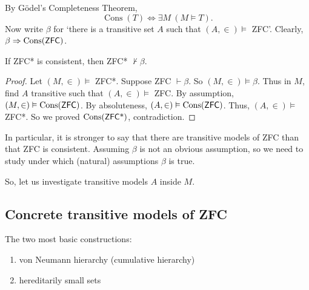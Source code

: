 \documentclass{article}
\DeclareMathOperator{\cons}{Cons}
\let\models\vDash
\begin{document}
By G\"odel's Completeness Theorem,
\begin{equation*}
  \cons(T) \iff \exists M\ (M \models T).
\end{equation*}
Now write $\beta$ for `there is a transitive set $A$ such that $(A,\in) \models$ \textsf{ZFC}'.
Clearly, $\beta \Rightarrow \cons(\text{\textsf{ZFC}})$.
\begin{thm}
  If \textsf{ZFC*} is consistent, then \textsf{ZFC*} $\nvdash \beta$.
\end{thm}
\begin{proof}
  Let $(M,\in) \models$ \textsf{ZFC}*. Suppose \textsf{ZFC} $\vdash \beta$. So $(M,\in) \vDash \beta$.
  Thus in $M$, find $A$ transitive such that $(A,\in) \models$ \textsf{ZFC}.
  By assumption, $(M,\in) \models \cons(\text{\textsf{ZFC}})$. By absoluteness, $(A,\in) \vDash \cons(\text{\textsf{ZFC}})$.
  Thus, $(A,\in) \vDash$ \textsf{ZFC}*.
  So we proved $\cons(\text{\textsf{ZFC}*})$, contradiction.
\end{proof}

In particular, it is stronger to say that there are transitive models of \textsf{ZFC} than that \textsf{ZFC} is consistent.
Assuming $\beta$ is not an obvious assumption, so we need to study under which (natural) assumptions $\beta$ is true.

So, let us investigate transitive models $A$ inside $M$.

\subsection{Concrete transitive models of \textsf{ZFC}}
The two most basic constructions:
\begin{enumerate}
  \item von Neumann hierarchy (cumulative hierarchy)
  \item hereditarily small sets
\end{enumerate}
\end{document}
